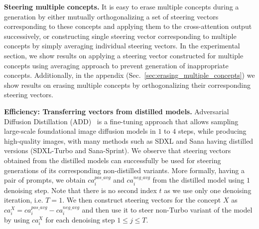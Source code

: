 \noindent\textbf{Steering multiple concepts.} It is easy to erase multiple concepts during a generation by either mutually orthogonalizing a set of steering vectors corresponding to these concepts and applying them to the cross-attention output successively, or constructing single steering vector corresponding to multiple concepts by simply averaging individual steering vectors. In the experimental section, we show results on applying a steering vector constructed for multiple concepts using averaging approach to prevent generation of inappropriate concepts. Additionally, in the appendix (Sec.~\ref{sec:erasing_multiple_concepts}) we show results on erasing multiple concepts by orthogonalizing their corresponding steering vectors.

\noindent\textbf{Efficiency: Transferring vectors from distilled models.} 
%
Adversarial Diffusion Distillation (ADD)~\cite{DBLP:conf/eccv/SauerLBR24} is a fine-tuning approach that allows sampling large-scale foundational image diffusion models in $1$ to $4$ steps, while producing high-quality images, with many methods such as SDXL and Sana having distilled versions (SDXL-Turbo and Sana-Sprint).
%
%
We observe that steering vectors obtained from the distilled models can successfully be used for steering generations of its corresponding non-distilled variants. 
%
More formally, having a pair of prompts, we obtain $ca^{pos\_avg}_{i}$ and $ca^{neg\_avg}_{i}$ from the distilled model using $1$ denoising step. 
%
Note that there is no second index $t$ as we use only one denoising iteration, i.e. $T=1$.
%
We then construct steering vectors for the concept $X$ as $ca^{X}_{i} = ca^{pos\_avg}_{i} - ca^{neg\_avg}_{i}$ and then use it to steer non-Turbo variant of the model by using $ca^{X}_{i}$ for each denoising step $1 \leqslant j \leqslant T$.

